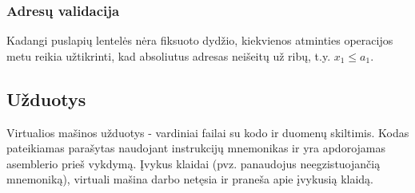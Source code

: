 \documentclass{scrartcl}
\begin{document}
            \subsubsection{Adresų validacija}
                Kadangi puslapių lentelės nėra fiksuoto dydžio, kiekvienos atminties operacijos metu reikia užtikrinti, kad absoliutus adresas neišeitų už ribų, t.y. $x_{1} \leq a_{1}$.
        \subsection{Užduotys}
            Virtualios mašinos užduotys - vardiniai failai su kodo ir duomenų skiltimis. Kodas pateikiamas parašytas naudojant instrukcijų mnemonikas ir yra apdorojamas asemblerio prieš vykdymą. Įvykus klaidai (pvz. panaudojus neegzistuojančią mnemoniką), virtuali mašina darbo netęsia ir praneša apie įvykusią klaidą.
\end{document}
